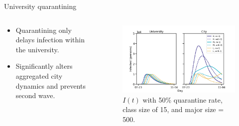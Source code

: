 \documentclass[aspectratio=169]{beamer}
\begin{document}
\begin{frame}{University quarantining}
    \begin{columns}
    \begin{column}{.3\textwidth}
    \vfill
        \begin{itemize}
            \item Quarantining only delays infection within the university.
            \item Significantly alters aggregated city dynamics and prevents second wave.
        \end{itemize}
        \vfill
    \end{column}
    \begin{column}{.7\textwidth}
    \vfill
        \begin{figure}[H]
            \centering
            \includegraphics[width=\textwidth]{figures/university_quarantining.png}
            \caption{$I(t)$ with 50\% quarantine rate, class size of 15, and major size = 500.}
        \end{figure}
        \vfill
    \end{column}
    \end{columns}
\end{frame}
\end{document}
